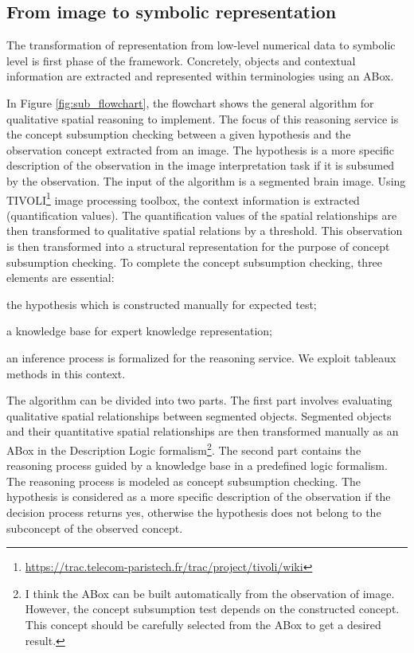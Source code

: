 \documentclass{article}
\begin{document}
\subsection{From image to symbolic representation}
The transformation of representation from low-level numerical data to symbolic level is first phase of the framework.
Concretely, objects and contextual information are extracted and represented within terminologies using an ABox.

In Figure \ref{fig:sub_flowchart}, the flowchart shows the general algorithm for qualitative spatial reasoning to implement. 
The focus of this reasoning service is the concept subsumption checking between a given hypothesis and the observation concept extracted from an image.
The hypothesis is a more specific description of the observation in the image interpretation task if it is subsumed by the observation.
The input of the algorithm is a segmented brain image. 
Using TIVOLI\footnote{\url{https://trac.telecom-paristech.fr/trac/project/tivoli/wiki}}
image processing toolbox, the context information is extracted (quantification values).
The quantification values of the spatial relationships are then transformed to qualitative spatial relations by a threshold. 
This observation is then transformed into a structural representation for the purpose of concept subsumption checking. 
To complete the concept subsumption checking, three elements are essential:
\begin{inparaenum}
 \item the hypothesis which is constructed manually for expected test;
 \item a knowledge base for expert knowledge representation;
 \item an inference process is formalized for the reasoning service. We exploit tableaux methods in this context.
\end{inparaenum}

The algorithm can be divided into two parts. The first part involves evaluating qualitative spatial relationships between segmented objects.
Segmented objects and their quantitative spatial relationships are then transformed manually as an ABox in the Description Logic formalism\footnote{I think the ABox can be built automatically
from the observation of image. However, the concept subsumption test depends on the constructed concept. This concept should be carefully selected from the ABox to get a desired result.}.
The second part contains the reasoning process guided by a knowledge base in a predefined logic formalism. The reasoning process is modeled as concept subsumption checking.
The hypothesis is considered as a more specific description of the observation if the decision process returns yes, otherwise the hypothesis does not belong to the subconcept of the observed concept.
\end{document}
